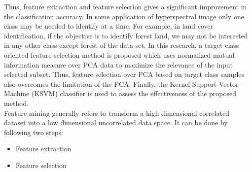 \documentclass[document.tex]{subfiles}
\begin{document}
\noindent Thus, feature extraction and feature selection gives a significant improvement in the classification accuracy. In some application of hyperspectral image only one class may be needed to identify at a time. For example, in land cover identification, if the objective is to identify forest land, we may not be interested in any other class except forest of the data set. In this research, a target class oriented feature selection method is proposed which uses normalized mutual information measure over PCA data to maximize the relevance  of the input selected subset. Thus, feature selection over PCA based on target class samples also  overcomes the limitation of the PCA. Finally, the Kernel Support Vector Machine (KSVM) classifier is used to assess the effectiveness of the proposed method. \\

\noindent Feature mining generally refers to transform a high dimensional correlated dataset into a low dimensional uncorrelated data space. It can be done by following two steps:
\begin{itemize}
	\item Feature extraction
	\item Feature selection
\end{itemize}
\end{document}
